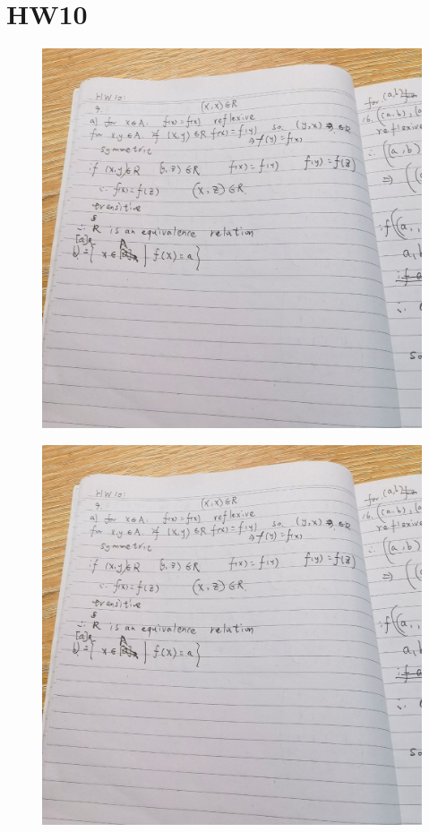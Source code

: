 \documentclass{article}
\begin{document}
        
\section*{HW10}

\begin{figure}[H]
\centering
\includegraphics[width=1\textwidth]{hw10/IMG_20221205_183723.jpg}
\caption{\label{Lab9}}
\end{figure}
        
\begin{figure}[H]
    \centering
    \includegraphics[width=1\textwidth]{hw10/IMG_20221205_183723.jpg}
    \caption{\label{Lab9}}
    \end{figure}
\end{document}
